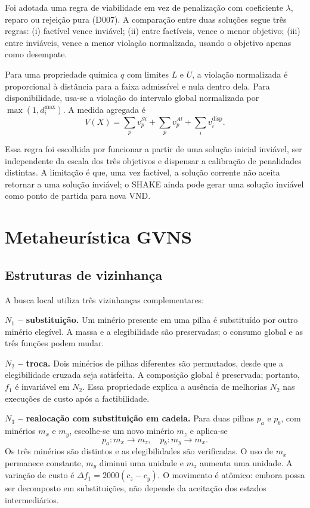 \documentclass[10pt,twocolumn,a4paper]{article}
\begin{document}
Foi adotada uma regra de viabilidade em vez de penalização com coeficiente $\lambda$, reparo ou rejeição pura (D007). A comparação entre duas soluções segue três regras: (i) factível vence inviável; (ii) entre factíveis, vence o menor objetivo; (iii) entre inviáveis, vence a menor violação normalizada, usando o objetivo apenas como desempate.

Para uma propriedade química $q$ com limites $L$ e $U$, a violação normalizada é proporcional à distância para a faixa admissível e nula dentro dela. Para disponibilidade, usa-se a violação do intervalo global normalizada por $\max(1, d_i^{\max})$. A medida agregada é
\begin{equation}
V(X) = \sum_{p} v_p^{Si} + \sum_{p} v_p^{Al} + \sum_{i} v_i^{\text{disp}}.
\end{equation}

Essa regra foi escolhida por funcionar a partir de uma solução inicial inviável, ser independente da escala dos três objetivos e dispensar a calibração de penalidades distintas. A limitação é que, uma vez factível, a solução corrente não aceita retornar a uma solução inviável; o SHAKE ainda pode gerar uma solução inviável como ponto de partida para nova VND.

\section{Metaheurística GVNS}

\subsection{Estruturas de vizinhança}

A busca local utiliza três vizinhanças complementares:

\noindent\textbf{$N_1$ -- substituição.} Um minério presente em uma pilha é substituído por outro minério elegível. A massa e a elegibilidade são preservadas; o consumo global e as três funções podem mudar.

\noindent\textbf{$N_2$ -- troca.} Dois minérios de pilhas diferentes são permutados, desde que a elegibilidade cruzada seja satisfeita. A composição global é preservada; portanto, $f_1$ é invariável em $N_2$. Essa propriedade explica a ausência de melhorias $N_2$ nas execuções de custo após a factibilidade.

\noindent\textbf{$N_3$ -- realocação com substituição em cadeia.} Para duas pilhas $p_a$ e $p_b$, com minérios $m_x$ e $m_y$, escolhe-se um novo minério $m_z$ e aplica-se
\begin{equation}
p_a : m_x \to m_z, \quad p_b : m_y \to m_x.
\end{equation}
Os três minérios são distintos e as elegibilidades são verificadas. O uso de $m_x$ permanece constante, $m_y$ diminui uma unidade e $m_z$ aumenta uma unidade. A variação de custo é $\Delta f_1 = 2000(c_z - c_y)$. O movimento é atômico: embora possa ser decomposto em substituições, não depende da aceitação dos estados intermediários.
\end{document}

